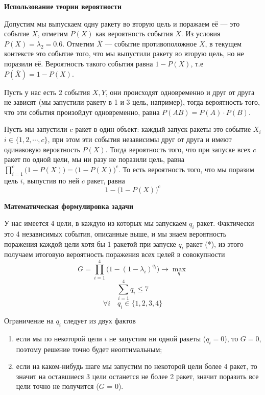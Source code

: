 \textbf{Использование теории вероятности}

Допустим мы выпускаем одну ракету во вторую цель и поражаем её --- это событие $X$, отметим $P(X)$ как вероятность события $X$. Из условия $P(X) = \lambda_2 = 0.6$. Отметим $\bar{X}$ --- событие противоположное $X$, в текущем контексте это событие того, что мы выпустили ракету во вторую цель, но не поразили её. Вероятность такого события равна $1 - P(X)$, т.е $P(\bar{X})=1-P(X)$.

Пусть у нас есть 2 события $X, Y$, они происходят одновременно и друг от друга не зависят (мы запустили ракету в 1 и 3 цель, например), тогда вероятность того, что эти события произойдут одновременно, равна $P(AB)=P(A) \cdot P(B)$.

Пусть мы запустили $c$ ракет в один объект: каждый запуск ракеты это событие $X_i$ $i \in \{1, 2, \cdots, c\}$, при этом эти события независимы друг от друга и имеют одинаковую вероятность $P(X)$. Тогда вероятность того, что при запуске всех $c$ ракет по одной цели, мы ни разу не поразили цель, равна $\displaystyle \prod_{i=1}^{c} \big(1 - P(X)\big) = \big(1 - P(X)\big)^c$. То есть вероятность того, что мы поразим цель $i$, выпустив по ней $c$ ракет, равна 
\[1 - \big(1 - P(X)\big)^c \tag{*}\]

\textbf{Математическая формулировка задачи}

У нас имеется 4 цели, в каждую из которых мы запускаем $q_i$ ракет. Фактически это 4 независимых события, описанные выше, и мы знаем вероятность поражения каждой цели хотя бы 1 ракетой при запуске $q_i$ ракет (*), из этого получаем итоговую вероятность поражения всех целей в совокупности
\[G = \displaystyle \prod_{i=1}^{4} \big(1 - (1 - \lambda_i)^{q_i}\big) \to \max_q\]
\[\sum_{i=1}^4 q_i \le 7\]
\[\forall i \quad q_i \in \{1, 2, 3, 4\}\]

Ограничение на $q_i$ следует из двух фактов

\begin{enumerate}[nosep]
	\item если мы по некоторой цели $i$ не запустим ни одной ракеты ($q_i = 0$), то $G = 0$, поэтому решение точно будет неоптимальным;
	
	\item если на каком-нибудь шаге мы запустим по некоторой цели более 4 ракет, то значит на оставшиеся 3 цели останется не более 2 ракет, значит поразить все цели точно не получится ($G$ = 0).
\end{enumerate}

\solution

